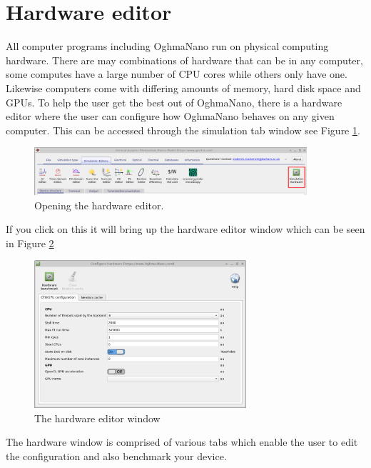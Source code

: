 \clearpage
\section{Hardware editor}
All computer programs including OghmaNano run on physical computing hardware. There are may combinations of hardware that can be in any computer, some computes have a large number of CPU cores while others only have one. Likewise computers come with differing amounts of memory, hard disk space and GPUs. To help the user get the best out of OghmaNano, there is a hardware editor where the user can configure how OghmaNano behaves on any given computer. This can be accessed through the simulation tab window see Figure \ref{fig:hardware_ribbon}. 

\begin{figure}[H]
\centering
\includegraphics[width=0.9\textwidth,height=0.15\textwidth]{./images/sim_editors/ribbon_hardware.png}
\caption{Opening the hardware editor.}
\label{fig:hardware_ribbon}
\end{figure}

If you click on this it will bring up the hardware editor window which can be seen in Figure \ref{fig:hardware_editor}

\begin{figure}[H]
\centering
\includegraphics[width=0.7\textwidth,height=0.5\textwidth]{./images/hardware/cpu.png}
\caption{The hardware editor window}
\label{fig:hardware_editor}
\end{figure}

The hardware window is comprised of various tabs which enable the user to edit the configuration and also benchmark your device. 

